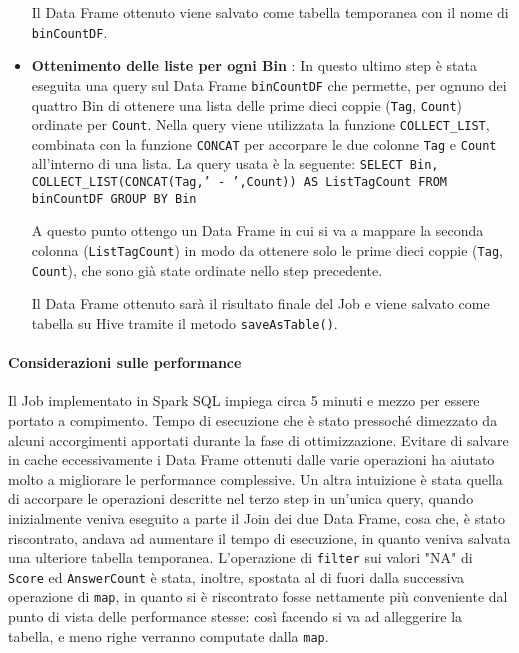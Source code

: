 \begin{itemize}
    Il Data Frame ottenuto viene salvato come tabella temporanea con il nome di \texttt{binCountDF}.
    \item \textbf{Ottenimento delle liste per ogni Bin} : In questo ultimo step è stata eseguita una query sul Data Frame
    \texttt{binCountDF} che permette, per ognuno dei quattro Bin di ottenere una lista delle prime dieci coppie
    (\texttt{Tag}, \texttt{Count}) ordinate per \texttt{Count}.
    Nella query viene utilizzata la funzione \texttt{COLLECT\_LIST}, combinata con la funzione \texttt{CONCAT} per accorpare
    le due colonne \texttt{Tag} e \texttt{Count} all'interno di una lista.
    La query usata è la seguente:
    \texttt{SELECT Bin, COLLECT\_LIST(CONCAT(Tag,' - ',Count)) AS ListTagCount FROM binCountDF GROUP BY Bin}

    A questo punto ottengo un Data Frame in cui si va a mappare la seconda colonna (\texttt{ListTagCount}) in modo da ottenere
    solo le prime dieci coppie (\texttt{Tag}, \texttt{Count}), che sono già state ordinate nello step precedente.

    Il Data Frame ottenuto sarà il risultato finale del Job e viene salvato come tabella su Hive tramite il metodo
    \texttt{saveAsTable()}.
  \end{itemize}


  \paragraph{Considerazioni sulle performance}\label{par:job2:spark:performance}

  Il Job implementato in Spark SQL impiega circa 5 minuti e mezzo per essere portato a compimento.
  Tempo di esecuzione che è stato pressoché dimezzato da alcuni accorgimenti apportati durante la fase di ottimizzazione.
  Evitare di salvare in cache eccessivamente i Data Frame ottenuti dalle varie operazioni ha aiutato molto a migliorare
  le performance complessive.
  Un altra intuizione è stata quella di accorpare le operazioni descritte nel terzo step in un'unica query, quando inizialmente
  veniva eseguito a parte il Join dei due Data Frame, cosa che, è stato riscontrato, andava ad aumentare il tempo di esecuzione,
  in quanto veniva salvata una ulteriore tabella temporanea.
  L'operazione di \texttt{filter} sui valori "NA" di \texttt{Score} ed \texttt{AnswerCount} è stata, inoltre, spostata al di fuori
  dalla successiva operazione di \texttt{map}, in quanto si è riscontrato fosse nettamente più conveniente dal punto di vista
  delle performance stesse: così facendo si va ad alleggerire la tabella, e meno righe verranno computate dalla \texttt{map}.


